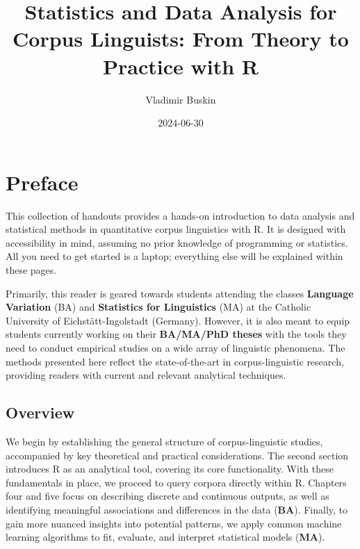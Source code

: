 \documentclass[
  11pt,
  letterpaper,
  DIV=11,
  numbers=noendperiod]{scrreprt}
\title{Statistics and Data Analysis for Corpus Linguists: From Theory to
Practice with R}
\author{Vladimir Buskin}
\date{2024-06-30}
\renewcommand*\contentsname{Table of contents}
\newcommand\contentsname{Table of contents}
\begin{document}
\maketitle
\renewcommand*\contentsname{Table of contents}
{
\hypersetup{linkcolor=}
\setcounter{tocdepth}{2}
\tableofcontents
}
\chapter*{Preface}\label{preface}


This collection of handouts provides a hands-on introduction to data
analysis and statistical methods in quantitative corpus linguistics with
R. It is designed with accessibility in mind, assuming no prior
knowledge of programming or statistics. All you need to get started is a
laptop; everything else will be explained within these pages.

Primarily, this reader is geared towards students attending the classes
\textbf{Language Variation} (BA) and \textbf{Statistics for Linguistics}
(MA) at the Catholic University of Eichstätt-Ingolstadt (Germany).
However, it is also meant to equip students currently working on their
\textbf{BA/MA/PhD theses} with the tools they need to conduct empirical
studies on a wide array of linguistic phenomena. The methods presented
here reflect the state-of-the-art in corpus-linguistic research,
providing readers with current and relevant analytical techniques.

\section*{Overview}\label{overview}


We begin by establishing the general structure of corpus-linguistic
studies, accompanied by key theoretical and practical considerations.
The second section introduces R as an analytical tool, covering its core
functionality. With these fundamentals in place, we proceed to query
corpora directly within R. Chapters four and five focus on describing
discrete and continuous outputs, as well as identifying meaningful
associations and differences in the data (\textbf{BA}). Finally, to gain
more nuanced insights into potential patterns, we apply common machine
learning algorithms to fit, evaluate, and interpret statistical models
(\textbf{MA}).
\end{document}
